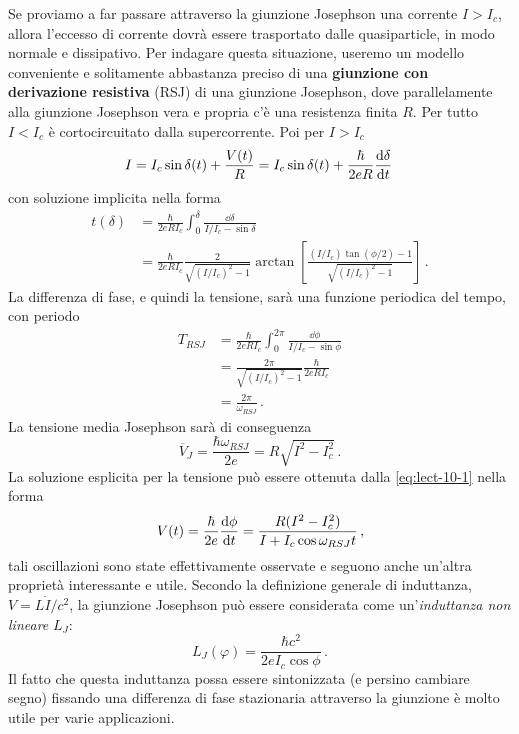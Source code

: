 \vspace{1cm}
\newline
{}
\noindent Se proviamo a far passare attraverso la giunzione Josephson una corrente $I >I_c$, allora l'eccesso di corrente dovrà essere trasportato dalle quasiparticle, in modo normale e dissipativo. Per indagare questa situazione, useremo un modello conveniente e solitamente abbastanza preciso di una \textbf{giunzione con derivazione resistiva} (RSJ) di una giunzione Josephson, dove parallelamente alla giunzione Josephson vera e propria c'è una resistenza finita $R$. Per tutto $I < I_c$ è cortocircuitato dalla supercorrente. Poi per $I > I_c$
\begin{equation*}
    I = I_c \sin \delta(t)+\frac{V(t)}{R} = I_c\sin \delta(t) + \frac{\hbar}{2eR}\dv{\delta}{t} \, 
\end{equation*}
con soluzione implicita nella forma
\begin{equation}
    \begin{aligned}
        t(\delta) &= \frac{\hbar}{2eRI_c}\int_0^\delta \frac{\dd{\delta}}{I/I_c - \sin \delta}\\
        &= \frac{\hbar}{2eRI_c}\frac{2}{\sqrt{(I/I_c)^2-1}}\arctan{\left[\frac{(I/I_c)\tan{(\phi/2)}-1}{\sqrt{(I/I_c)^2-1}}\right]} \, .
        \label{eq:lect-10-1}
    \end{aligned}
\end{equation}
La differenza di fase, e quindi la tensione, sarà una funzione periodica del tempo, con periodo
\begin{align*}
    T_{RSJ} &= \frac{\hbar}{2eRI_c}\int_0^{2\pi} \frac{\dd{\phi}}{I/I_c-\sin\phi} \\
    &= \frac{2\pi}{\sqrt{(I/I_c)^2-1}}\frac{\hbar}{2eRI_c} \\
    &= \frac{2\pi}{\omega_{RSJ}} \, .
\end{align*}
La tensione media Josephson sarà di conseguenza
\begin{equation*}
    \overline{V}_J = \frac{\hbar\omega_{RSJ}}{2e} = R\sqrt{I^2 - I_c^2} \, .
\end{equation*}
La soluzione esplicita per la tensione può essere ottenuta dalla \eqref{eq:lect-10-1} nella forma
\begin{equation*}
    V(t) = \frac{\hbar}{2e}\dv{\phi}{t} = \frac{R(I^2-I_c^2)}{I+I_c\cos\omega_{RSJ}t} \, ,
\end{equation*}
tali oscillazioni sono state effettivamente osservate e seguono anche un'altra proprietà interessante e utile. Secondo la definizione generale di induttanza, $V =L\dot{I}/c^2$, la giunzione Josephson può essere considerata come un'\textit{induttanza non lineare} $L_J$:
\begin{equation*}
    L_J(\varphi) = \frac{\hbar c^2}{2eI_c\cos\phi} \, .
\end{equation*}
Il fatto che questa induttanza possa essere sintonizzata (e persino cambiare segno) fissando una differenza di fase stazionaria attraverso la giunzione è molto utile per varie applicazioni.
